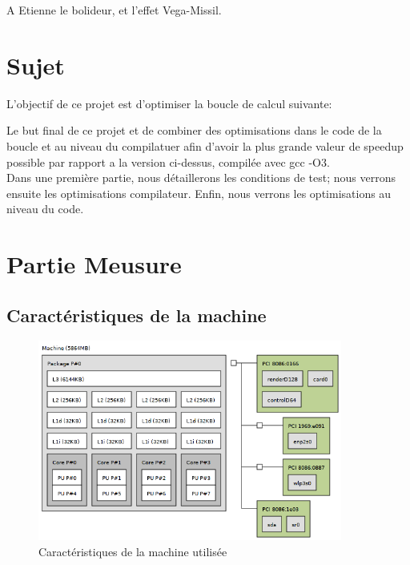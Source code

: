 \documentclass[a4paper]{report}
\begin{document}
\vspace*{\fill}
\begin{centering}
    A Etienne le bolideur, et l'effet Vega-Missil.
\end{centering}
\vspace*{\fill}
\newpage


\chapter*{Sujet}

L'objectif de ce projet est d'optimiser la boucle de calcul suivante:

Le but final de ce projet et de combiner des optimisations dans le code de la boucle et au niveau du compilatuer afin d'avoir la plus grande valeur de speedup possible par rapport a la version ci-dessus, compilée avec gcc -O3.\\

Dans une première partie, nous détaillerons les conditions de test; nous verrons ensuite les optimisations compilateur. Enfin, nous verrons les optimisations au niveau du code.

\chapter*{Partie Meusure}

\section*{Caractéristiques de la machine}

\begin{figure}[ht!]
        \centering
        \includegraphics[width=100mm]{MEDIA/Topo.png}
        \caption{Caractéristiques de la machine utilisée}
    \end{figure}
\end{document}
